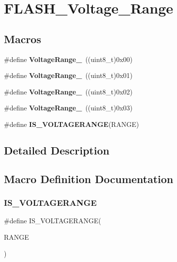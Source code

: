 \section{F\+L\+A\+S\+H\+\_\+\+Voltage\+\_\+\+Range}
\label{group__FLASH__Voltage__Range}
\subsection*{Macros}
\begin{DoxyCompactItemize}
\item 
\#define \textbf{ Voltage\+Range\+\_}~((uint8\+\_\+t)0x00)
\item 
\#define \textbf{ Voltage\+Range\+\_}~((uint8\+\_\+t)0x01)
\item 
\#define \textbf{ Voltage\+Range\+\_}~((uint8\+\_\+t)0x02)
\item 
\#define \textbf{ Voltage\+Range\+\_}~((uint8\+\_\+t)0x03)
\item 
\#define \textbf{ I\+S\+\_\+\+V\+O\+L\+T\+A\+G\+E\+R\+A\+N\+GE}(R\+A\+N\+GE)
\end{DoxyCompactItemize}


\subsection{Detailed Description}


\subsection{Macro Definition Documentation}
\mbox{\label{group__FLASH__Voltage__Range_gaa9682aea9d9ceebca83c48e53f9f6028}} 
\subsubsection{I\+S\+\_\+\+V\+O\+L\+T\+A\+G\+E\+R\+A\+N\+GE}
{\footnotesize\ttfamily \#define I\+S\+\_\+\+V\+O\+L\+T\+A\+G\+E\+R\+A\+N\+GE(\begin{DoxyParamCaption}\item[{}]{R\+A\+N\+GE }\end{DoxyParamCaption})}

